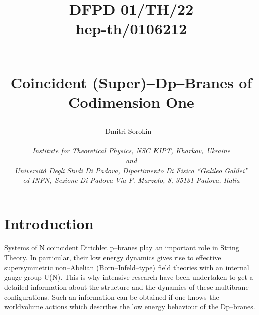 \documentclass[a4paper,12pt]{article}
\begin{document}

\title{
\begin{flushright}
{\small {DFPD 01/TH/22\\
\vspace{-15pt}
 hep-th/0106212
} }
\end{flushright}
~\\
{Coincident (Super)--Dp--Branes of Codimension One}
 }

\bigskip
\author{
Dmitri Sorokin
~\\
~\\
{\it Institute for Theoretical Physics, NSC KIPT,
Kharkov, Ukraine}\\
{\it and}\\
{\it Universit\`a Degli Studi Di Padova,
Dipartimento Di Fisica ``Galileo Galilei''}\\
{\it ed INFN, Sezione Di Padova Via F. Marzolo, 8, 35131 Padova,
Italia}\\
}
\date{}

\maketitle


\bigskip
\noindent
\renewcommand{\thefootnote}{\arabic{footnote}}
\thispagestyle{empty}
\newpage
\section{Introduction}
Systems of N coincident Dirichlet p--branes play an important role
in String Theory. In particular, their low energy dynamics gives
rise to effective supersymmetric non--Abelian (Born--Infeld--type)
field theories with an internal gauge group U(N). This is why
intensive research have been undertaken to get a detailed
information about the structure and the dynamics of these
multibrane configurations. Such an information can be obtained if
one knows the worldvolume actions which describes the low energy
behaviour of the Dp--branes.
\end{document}
